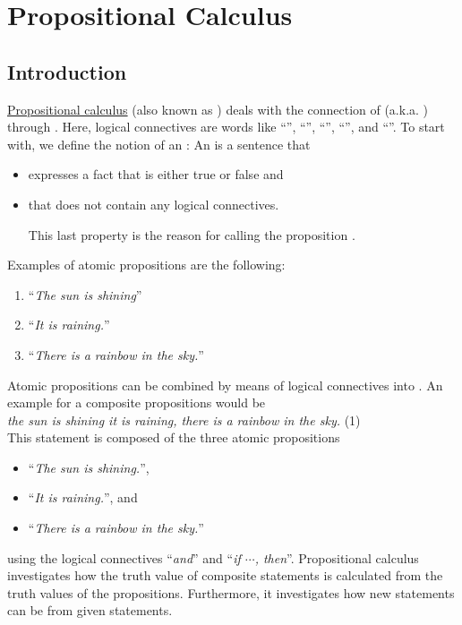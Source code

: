 \chapter{Propositional Calculus}
\section{Introduction}
\href{https://en.wikipedia.org/wiki/Propositional_calculus}{Propositional calculus}
(also known as ) deals with the connection of
(a.k.a. ) through 
.  Here, logical connectives are words like ``'', ``'',
``'', ``'', and ``''.  To start with, we define the notion
of an : An
 is a sentence  that 
\begin{itemize}
\item expresses a fact that is either true or false and
\item that does not contain any logical connectives.

      This last property is the reason for calling the proposition .
\end{itemize}
Examples of atomic propositions are the following:
\begin{enumerate}
\item ``\textsl{The sun is shining}''
\item ``\textsl{It is raining.}''
\item ``\textsl{There is a rainbow in the sky.}''
\end{enumerate}
Atomic propositions can be combined by means of logical connectives
into .  An example for a
composite propositions would be
\\[0.2cm] 
\hspace*{1.3cm}
\textsl{ the sun is shining  it is raining,  there is a rainbow in the sky.} 
\hspace*{\fill} (1)
\\[0.2cm]
This statement is composed of the three atomic propositions
\begin{itemize}
\item ``\textsl{The sun is shining.}'', 
\item ``\textsl{It is raining.}'', and
\item ``\textsl{There is a rainbow in the sky.}''
\end{itemize}
using the logical connectives ``\textsl{and}'' and ``\textsl{if $\cdots$, then}''.
Propositional calculus investigates how the truth value of composite statements is
calculated from the truth values of the propositions.  Furthermore, it investigates
how new statements can be  from given statements. 

